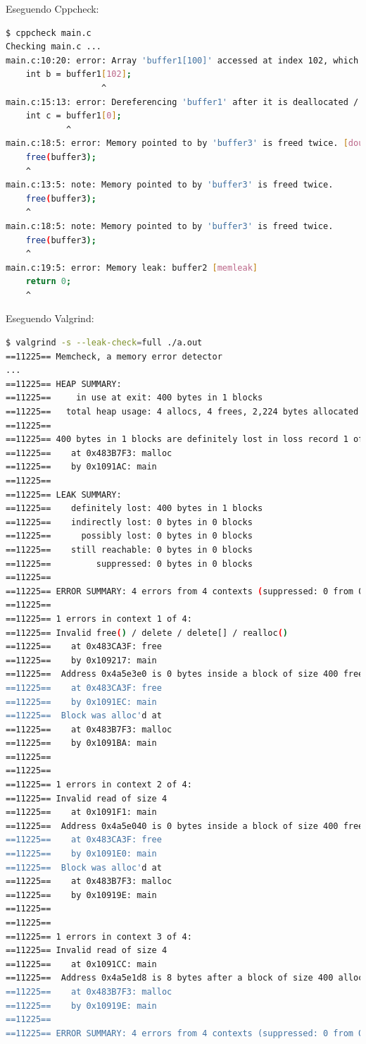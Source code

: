 \documentclass{article}
\begin{document}
Eseguendo Cppcheck:

\begin{lstlisting}[language=bash]
$ cppcheck main.c 
Checking main.c ...
main.c:10:20: error: Array 'buffer1[100]' accessed at index 102, which is out of bounds. [arrayIndexOutOfBounds]
    int b = buffer1[102];
                   ^
main.c:15:13: error: Dereferencing 'buffer1' after it is deallocated / released [deallocuse]
    int c = buffer1[0];
            ^
main.c:18:5: error: Memory pointed to by 'buffer3' is freed twice. [doubleFree]
    free(buffer3);
    ^
main.c:13:5: note: Memory pointed to by 'buffer3' is freed twice.
    free(buffer3);
    ^
main.c:18:5: note: Memory pointed to by 'buffer3' is freed twice.
    free(buffer3);
    ^
main.c:19:5: error: Memory leak: buffer2 [memleak]
    return 0;
    ^
\end{lstlisting}

Eseguendo Valgrind:

\begin{lstlisting}[language=bash]
$ valgrind -s --leak-check=full ./a.out 
==11225== Memcheck, a memory error detector
...
==11225== HEAP SUMMARY:
==11225==     in use at exit: 400 bytes in 1 blocks
==11225==   total heap usage: 4 allocs, 4 frees, 2,224 bytes allocated
==11225== 
==11225== 400 bytes in 1 blocks are definitely lost in loss record 1 of 1
==11225==    at 0x483B7F3: malloc 
==11225==    by 0x1091AC: main 
==11225== 
==11225== LEAK SUMMARY:
==11225==    definitely lost: 400 bytes in 1 blocks
==11225==    indirectly lost: 0 bytes in 0 blocks
==11225==      possibly lost: 0 bytes in 0 blocks
==11225==    still reachable: 0 bytes in 0 blocks
==11225==         suppressed: 0 bytes in 0 blocks
==11225== 
==11225== ERROR SUMMARY: 4 errors from 4 contexts (suppressed: 0 from 0)
==11225== 
==11225== 1 errors in context 1 of 4:
==11225== Invalid free() / delete / delete[] / realloc()
==11225==    at 0x483CA3F: free 
==11225==    by 0x109217: main 
==11225==  Address 0x4a5e3e0 is 0 bytes inside a block of size 400 free'd
==11225==    at 0x483CA3F: free 
==11225==    by 0x1091EC: main 
==11225==  Block was alloc'd at
==11225==    at 0x483B7F3: malloc 
==11225==    by 0x1091BA: main 
==11225== 
==11225== 
==11225== 1 errors in context 2 of 4:
==11225== Invalid read of size 4
==11225==    at 0x1091F1: main 
==11225==  Address 0x4a5e040 is 0 bytes inside a block of size 400 free'd
==11225==    at 0x483CA3F: free 
==11225==    by 0x1091E0: main 
==11225==  Block was alloc'd at
==11225==    at 0x483B7F3: malloc 
==11225==    by 0x10919E: main 
==11225== 
==11225== 
==11225== 1 errors in context 3 of 4:
==11225== Invalid read of size 4
==11225==    at 0x1091CC: main 
==11225==  Address 0x4a5e1d8 is 8 bytes after a block of size 400 alloc'd
==11225==    at 0x483B7F3: malloc 
==11225==    by 0x10919E: main 
==11225== 
==11225== ERROR SUMMARY: 4 errors from 4 contexts (suppressed: 0 from 0)
\end{lstlisting}
\end{document}
